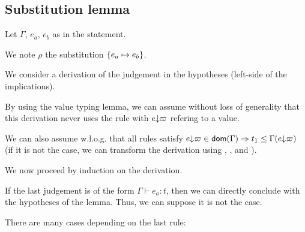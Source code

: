 \documentclass[a4paper]{article}
\theoremstyle{definition}
\begin{document}
        \subsection{Substitution lemma}

        Let $\Gamma$, $e_a$, $e_b$ as in the statement.

        We note $\rho$ the substitution $\{e_a \mapsto e_b\}$.

        We consider a derivation of the judgement in the hypotheses (left-side of the implications).

        By using the value typing lemma, we can assume without loss of generality that this derivation
        never uses the rule  with $e{\downarrow}\varpi$ refering to a value.

        We can also assume w.l.o.g. that all rules  satisfy
        $e{\downarrow}\varpi \in\textsf{dom}(\Gamma) \Rightarrow t_1 \leq \Gamma(e{\downarrow}\varpi)$ (if it is not the case,
        we can transform the derivation using , ,  and ).

        We now proceed by induction on the derivation.
        
        If the last judgement is of the form $\Gamma \vdash e_a: t$, then we can directly conclude with the hypotheses of the lemma.
        Thus, we can suppose it is not the case.

        There are many cases depending on the last rule:
\end{document}
